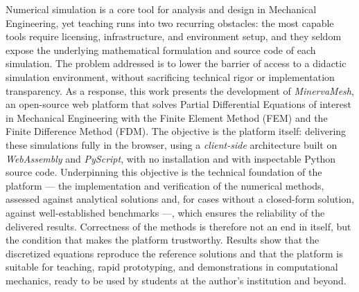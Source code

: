 \begin{foreignabstract}

Numerical simulation is a core tool for analysis and design in Mechanical Engineering, yet teaching runs into two recurring obstacles: the most capable tools require licensing, infrastructure, and environment setup, and they seldom expose the underlying mathematical formulation and source code of each simulation. The problem addressed is to lower the barrier of access to a didactic simulation environment, without sacrificing technical rigor or implementation transparency. As a response, this work presents the development of \textit{MinervaMesh}, an open-source web platform that solves Partial Differential Equations of interest in Mechanical Engineering with the Finite Element Method (FEM) and the Finite Difference Method (FDM). The objective is the platform itself: delivering these simulations fully in the browser, using a \textit{client-side} architecture built on \textit{WebAssembly} and \textit{PyScript}, with no installation and with inspectable Python source code. Underpinning this objective is the technical foundation of the platform --- the implementation and verification of the numerical methods, assessed against analytical solutions and, for cases without a closed-form solution, against well-established benchmarks ---, which ensures the reliability of the delivered results. Correctness of the methods is therefore not an end in itself, but the condition that makes the platform trustworthy. Results show that the discretized equations reproduce the reference solutions and that the platform is suitable for teaching, rapid prototyping, and demonstrations in computational mechanics, ready to be used by students at the author's institution and beyond.

\end{foreignabstract}
